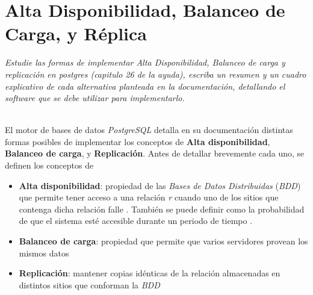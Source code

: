 







\clearpage
\tableofcontents
\clearpage 


\lstset{style=sql}


\section{Alta Disponibilidad, Balanceo de Carga, y Réplica}
\emph{Estudie las formas de implementar Alta Disponibilidad, Balanceo de carga y replicación en postgres (capitulo 26 de la ayuda), escriba un resumen y un cuadro explicativo de cada alternativa planteada en la documentación, detallando el software que se debe utilizar para implementarlo.} 

~\\

El motor de bases de datos \emph{PostgreSQL} detalla en su documentación distintas formas posibles de implementar los conceptos de \textbf{Alta disponibilidad}, \textbf{Balanceo de carga}, y \textbf{Replicación}. Antes de detallar brevemente cada uno, se definen los conceptos de
\begin{itemize}
    \item \textbf{Alta disponibilidad}: propiedad de las \emph{Bases de Datos Distribuidas} (\emph{BDD}) que permite tener acceso a una relación \emph{r} cuando uno de los sitios que contenga dicha relación falle \autocite{silberschatz}. También se puede definir como la probabilidad de que el sistema esté accesible durante un periodo de tiempo \autocite{elmasri}.
    \item \textbf{Balanceo de carga}: propiedad que permite que varios servidores provean los mismos datos \autocite{high-availability}
    \item \textbf{Replicación}: mantener copias idénticas de la relación almacenadas en distintos sitios que conforman la \emph{BDD} \autocite{silberschatz} 
\end{itemize}

